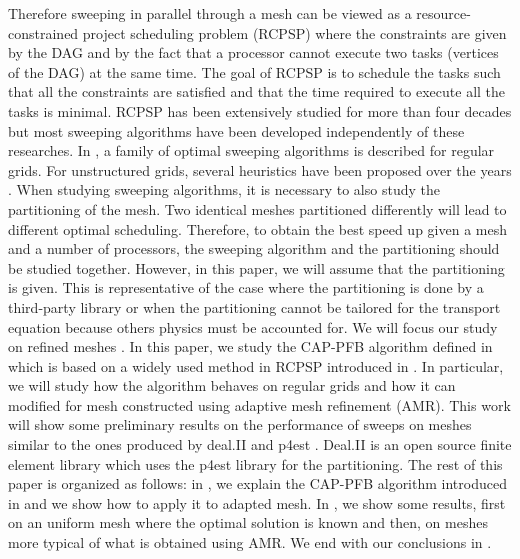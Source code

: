 \documentclass[letterpaper]{article}
\renewcommand{\(}{\left(}
\renewcommand{\)}{\right)}
\renewcommand{\[}{\left[}
\renewcommand{\]}{\right]}
\begin{document}
Therefore sweeping in
parallel through a mesh can be viewed as a resource-constrained project
scheduling problem (RCPSP) \cite{Brucker1999,Kolisch2006} where the constraints
are given by the DAG and by the fact that a processor cannot execute two tasks
(vertices of the DAG) at the same time. 
The goal of RCPSP is to schedule the tasks such that all the constraints are
satisfied and that the time required to execute all the tasks is minimal. 
RCPSP has been extensively studied for more than four decades \cite{Pritsker1969} but most
sweeping algorithms have been developed independently of these researches. 
In \cite{Adams2013}, a family of optimal sweeping algorithms is described for
regular grids. For unstructured grids, several heuristics have been proposed
over the years \cite{Pautz2002,Plimpton2005,Yan2013,Colomer2013,Kumar2005,Mo2014}. When
studying sweeping algorithms, it is necessary to also study the partitioning of
the mesh. Two identical meshes partitioned differently will lead to different
optimal scheduling. Therefore, to obtain the best speed up given a mesh and a
number of processors, the sweeping algorithm and the partitioning should be
studied together. However, in this paper, we will assume that the partitioning
is given. This is representative of the case where the partitioning is done by a
third-party library or when the partitioning cannot be tailored for the
transport equation because others physics must be accounted for. We will focus
our study on refined meshes
\cite{Arnold2000,Baker2002,Bangerth2007,Jessee1998,Wang2010a}.
In this paper, we
study the CAP-PFB algorithm defined in \cite{Mo2014} which is based on a widely
used method in RCPSP introduced in \cite{Li1992}. In particular, we will study
how the algorithm behaves on regular grids and how it can modified for mesh
constructed using adaptive mesh refinement (AMR). This work will show some
preliminary results on the performance of sweeps on meshes similar to the ones
produced by deal.II \cite{Bangerth2007,Bangerth2013} and p4est
\cite{Burstedde2011}. Deal.II is an open source finite element library which
uses the p4est library for the partitioning. The rest of this paper is organized
as follows: in , we explain the CAP-PFB algorithm
introduced in \cite{Mo2014} and we show how to apply it to adapted mesh. In
, we show some results, first on an uniform mesh where the optimal
solution is known and then, on meshes more typical of what is obtained using
AMR. We end with our conclusions in .
\end{document}

